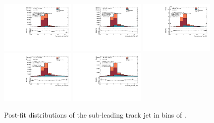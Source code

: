 \begin{figure}[htbp]
  \centering
 \includegraphics[width=0.32\textwidth]{figures/gbb/Sub_Sd0_Fits/Canv_Fit_-3-logM_bb_over_p_TG--22_LpT_INF_SpT_INF_coarse_y.pdf}
 \includegraphics[width=0.32\textwidth]{figures/gbb/Sub_Sd0_Fits/Canv_Fit_-22-logM_bb_over_p_TG--19_LpT_INF_SpT_INF_coarse_y.pdf}
 \includegraphics[width=0.32\textwidth]{figures/gbb/Sub_Sd0_Fits/Canv_Fit_-19-logM_bb_over_p_TG--15_LpT_INF_SpT_INF_coarse_y.pdf}\\
 \includegraphics[width=0.32\textwidth]{figures/gbb/Sub_Sd0_Fits/Canv_Fit_-15-logM_bb_over_p_TG--11_LpT_INF_SpT_INF_coarse_y.pdf}
 \includegraphics[width=0.32\textwidth]{figures/gbb/Sub_Sd0_Fits/Canv_Fit_-11-logM_bb_over_p_TG-0_LpT_INF_SpT_INF_coarse_y.pdf}

\caption{Post-fit \subsdzero distributions of the sub-leading track jet in bins of \mpt. }
  \label{fig:fracmasspt-postfits-subleading}
\end{figure}


